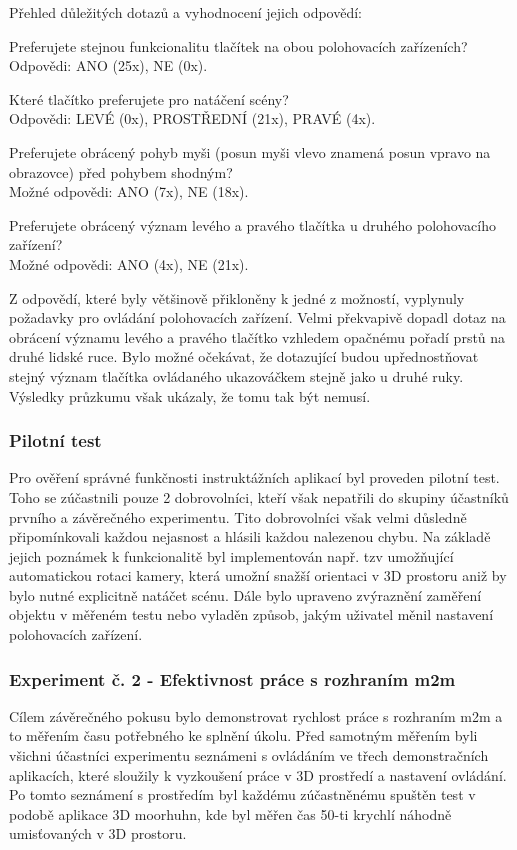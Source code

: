 \noindent Přehled důležitých dotazů a vyhodnocení jejich odpovědí:

\noindent Preferujete stejnou funkcionalitu tlačítek na obou polohovacích zařízeních?\\
Odpovědi: ANO (25x), NE (0x).

\noindent Které tlačítko preferujete pro natáčení scény?\\
Odpovědi: LEVÉ (0x), PROSTŘEDNÍ (21x), PRAVÉ (4x).

\noindent Preferujete obrácený pohyb myši (posun myši vlevo znamená posun vpravo na obrazovce) před pohybem shodným?\\
Možné odpovědi: ANO (7x), NE (18x).

\noindent Preferujete obrácený význam levého a pravého tlačítka u druhého polohovacího zařízení?\\
Možné odpovědi: ANO (4x), NE (21x).

Z odpovědí, které byly většinově přikloněny k jedné z možností, vyplynuly požadavky pro ovládání polohovacích zařízení. Velmi překvapivě dopadl dotaz na obrácení významu levého a pravého tlačítko vzhledem opačnému pořadí prstů na druhé lidské ruce. Bylo možné očekávat, že dotazující budou upřednostňovat stejný význam tlačítka ovládaného ukazováčkem stejně jako u druhé ruky. Výsledky průzkumu však ukázaly, že tomu tak být nemusí. 

\subsubsection{Pilotní test}
Pro ověření správné funkčnosti instruktážních aplikací byl proveden pilotní test. Toho se zúčastnili pouze 2 dobrovolníci, kteří však nepatřili do skupiny účastníků prvního a závěrečného experimentu. Tito dobrovolníci však velmi důsledně připomínkovali každou nejasnost a hlásili každou nalezenou chybu. Na základě jejich poznámek k funkcionalitě byl implementován např. tzv  umožňující automatickou rotaci kamery, která umožní snažší orientaci v 3D prostoru aniž by bylo nutné explicitně natáčet scénu. Dále bylo upraveno zvýraznění zaměření objektu v měřeném testu nebo vyladěn způsob, jakým uživatel měnil nastavení polohovacích zařízení.

\subsubsection{Experiment č. 2 - Efektivnost práce s rozhraním m2m}
Cílem závěrečného pokusu bylo demonstrovat rychlost práce s rozhraním m2m a to měřením času potřebného ke splnění úkolu. Před samotným měřením byli všichni účastníci experimentu seznámeni s ovládáním ve třech demonstračních aplikacích, které sloužily k vyzkoušení práce v 3D prostředí a nastavení ovládání. Po tomto seznámení s prostředím byl každému zúčastněnému spuštěn test v podobě aplikace 3D moorhuhn, kde byl měřen čas  50-ti krychlí náhodně umisťovaných v 3D prostoru.

